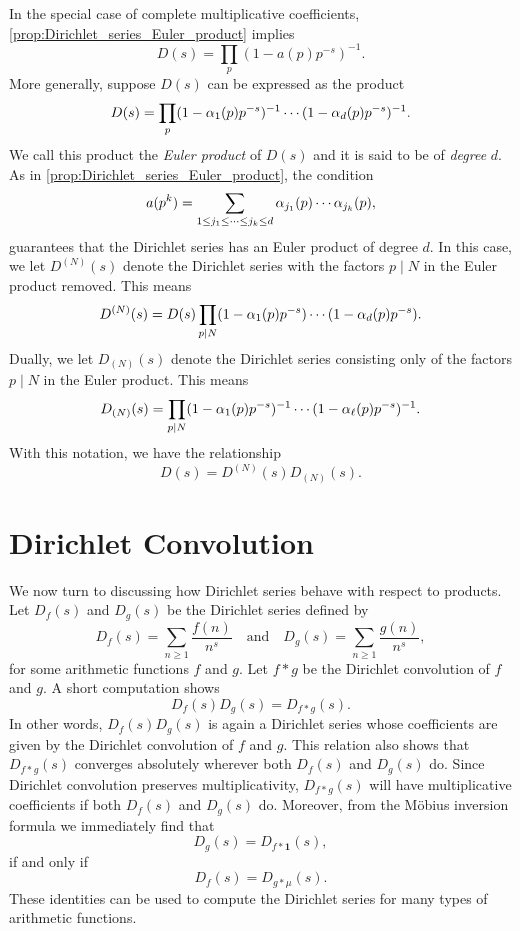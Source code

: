\documentclass[12pt]{article}
\begin{document}
    In the special case of complete multiplicative coefficients, \cref{prop:Dirichlet_series_Euler_product} implies
    \[
      D(s) = \prod_{p}(1-a(p)p^{-s})^{-1}.
    \]
    More generally, suppose \(D(s)\) can be expressed as the product
    \[
      D(s) = \prod_{p}(1-\alpha_{1}(p)p^{-s})^{-1} \cdots (1-\alpha_{d}(p)p^{-s})^{-1}.
    \]
    We call this product the \textit{Euler product} of \(D(s)\) and it is said to be of \textit{degree} \(d\). As in \cref{prop:Dirichlet_series_Euler_product}, the condition
    \[
      a(p^{k}) = \sum_{1 \le j_{1} \le \cdots \le j_{k} \le d}\alpha_{j_{1}}(p) \cdots \alpha_{j_{k}}(p),
    \]
    guarantees that the Dirichlet series has an Euler product of degree \(d\). In this case, we let \(D^{(N)}(s)\) denote the Dirichlet series with the factors \(p \mid N\) in the Euler product removed. This means
    \[
      D^{(N)}(s) = D(s)\prod_{p \mid N}(1-\alpha_{1}(p)p^{-s}) \cdots (1-\alpha_{d}(p)p^{-s}).
    \]
    Dually, we let \(D_{(N)}(s)\) denote the Dirichlet series consisting only of the factors \(p \mid N\) in the Euler product. This means
    \[
      D_{(N)}(s) = \prod_{p \mid N}(1-\alpha_{1}(p)p^{-s})^{-1} \cdots (1-\alpha_{\ell}(p)p^{-s})^{-1}.
    \]
    With this notation, we have the relationship
    \[
      D(s) = D^{(N)}(s)D_{(N)}(s).
    \]
  \section{Dirichlet Convolution}
    We now turn to discussing how Dirichlet series behave with respect to products. Let \(D_{f}(s)\) and \(D_{g}(s)\) be the Dirichlet series defined by
    \[
      D_{f}(s) = \sum_{n \ge 1}\frac{f(n)}{n^{s}} \quad \text{and} \quad D_{g}(s) = \sum_{n \ge 1}\frac{g(n)}{n^{s}},
    \]
    for some arithmetic functions \(f\) and \(g\). Let \(f \ast g\) be the Dirichlet convolution of \(f\) and \(g\). A short computation shows
    \[
      D_{f}(s)D_{g}(s) = D_{f \ast g}(s).
    \]
    In other words, \(D_{f}(s)D_{g}(s)\) is again a Dirichlet series whose coefficients are given by the Dirichlet convolution of \(f\) and \(g\). This relation also shows that \(D_{f \ast g}(s)\) converges absolutely wherever both \(D_{f}(s)\) and \(D_{g}(s)\) do. Since Dirichlet convolution preserves multiplicativity, \(D_{f \ast g}(s)\) will have multiplicative coefficients if both \(D_{f}(s)\) and \(D_{g}(s)\) do. Moreover, from the M\"obius inversion formula we immediately find that
    \[
      D_{g}(s) = D_{f \ast \mathbf{1}}(s),
    \]
    if and only if
    \[
      D_{f}(s) = D_{g \ast \mu}(s).
    \]
    These identities can be used to compute the Dirichlet series for many types of arithmetic functions.
\end{document}
